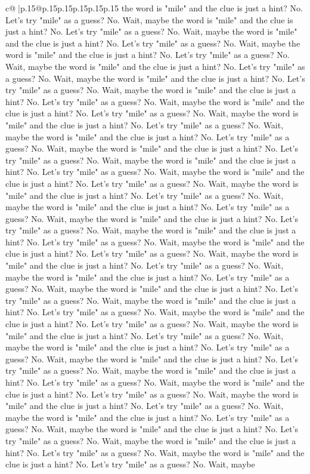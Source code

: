\documentclass{article}
\begin{document}
{\begin{supertabular}{c@{$\;$}|p{.15\linewidth}@{}p{.15\linewidth}p{.15\linewidth}p{.15\linewidth}p{.15\linewidth}p{.15\linewidth}}
{{{the word is "mile" and the clue is just a hint? No. Let's try "mile" as a guess? No. Wait, maybe the word is "mile" and the clue is just a hint? No. Let's try "mile" as a guess? No. Wait, maybe the word is "mile" and the clue is just a hint? No. Let's try "mile" as a guess? No. Wait, maybe the word is "mile" and the clue is just a hint? No. Let's try "mile" as a guess? No. Wait, maybe the word is "mile" and the clue is just a hint? No. Let's try "mile" as a guess? No. Wait, maybe the word is "mile" and the clue is just a hint? No. Let's try "mile" as a guess? No. Wait, maybe the word is "mile" and the clue is just a hint? No. Let's try "mile" as a guess? No. Wait, maybe the word is "mile" and the clue is just a hint? No. Let's try "mile" as a guess? No. Wait, maybe the word is "mile" and the clue is just a hint? No. Let's try "mile" as a guess? No. Wait, maybe the word is "mile" and the clue is just a hint? No. Let's try "mile" as a guess? No. Wait, maybe the word is "mile" and the clue is just a hint? No. Let's try "mile" as a guess? No. Wait, maybe the word is "mile" and the clue is just a hint? No. Let's try "mile" as a guess? No. Wait, maybe the word is "mile" and the clue is just a hint? No. Let's try "mile" as a guess? No. Wait, maybe the word is "mile" and the clue is just a hint? No. Let's try "mile" as a guess? No. Wait, maybe the word is "mile" and the clue is just a hint? No. Let's try "mile" as a guess? No. Wait, maybe the word is "mile" and the clue is just a hint? No. Let's try "mile" as a guess? No. Wait, maybe the word is "mile" and the clue is just a hint? No. Let's try "mile" as a guess? No. Wait, maybe the word is "mile" and the clue is just a hint? No. Let's try "mile" as a guess? No. Wait, maybe the word is "mile" and the clue is just a hint? No. Let's try "mile" as a guess? No. Wait, maybe the word is "mile" and the clue is just a hint? No. Let's try "mile" as a guess? No. Wait, maybe the word is "mile" and the clue is just a hint? No. Let's try "mile" as a guess? No. Wait, maybe the word is "mile" and the clue is just a hint? No. Let's try "mile" as a guess? No. Wait, maybe the word is "mile" and the clue is just a hint? No. Let's try "mile" as a guess? No. Wait, maybe the word is "mile" and the clue is just a hint? No. Let's try "mile" as a guess? No. Wait, maybe the word is "mile" and the clue is just a hint? No. Let's try "mile" as a guess? No. Wait, maybe the word is "mile" and the clue is just a hint? No. Let's try "mile" as a guess? No. Wait, maybe the word is "mile" and the clue is just a hint? No. Let's try "mile" as a guess? No. Wait, maybe the word is "mile" and the clue is just a hint? No. Let's try "mile" as a guess? No. Wait, maybe the word is "mile" and the clue is just a hint? No. Let's try "mile" as a guess? No. Wait, maybe the word is "mile" and the clue is just a hint? No. Let's try "mile" as a guess? No. Wait, maybe the word is "mile" and the clue is just a hint? No. Let's try "mile" as a guess? No. Wait, maybe the word is "mile" and the clue is just a hint? No. Let's try "mile" as a guess? No. Wait, maybe the word is "mile" and the clue is just a hint? No. Let's try "mile" as a guess? No. Wait, maybe }}}
\end{supertabular}}
\end{document}
